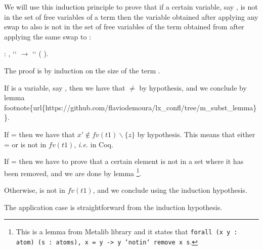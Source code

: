 We will use this induction principle to prove that if a certain variable, say , is not in the set of free variables of a term  then the variable obtained after applying any swap to  also is not in the set of free variables of the term obtained from  after applying the same swap to : 
\begin{coqdoccode}
\coqdocemptyline
\coqdocnoindent
{}  : \coqdockw{\ensuremath{\forall}}    ,  ``   \ensuremath{\rightarrow}      ``  (   ).\coqdoceol
\end{coqdoccode}
 The proof is by induction on the size of the term .
\begin{coqdoccode}
\end{coqdoccode}
If  is a variable, say , then we have that  \ensuremath{\not=}  by hypothesis, and we conclude by lemma  footnote\{url\{https://github.com/flaviodemoura/lx\_confl/tree/m\_subst\_lemma\}\}.
\begin{coqdoccode}
\end{coqdoccode}
If  =    then we have that $x' \notin fv(t1) \backslash \{z\}$ by hypothesis. This means that either  =  or  is not in $fv(t1)$, {\it i.e.}   in Coq.
\begin{coqdoccode}
\end{coqdoccode}
If  =  then we have to prove that a certain element is not in a set where it has been removed, and we are done by lemma \footnote{This is a lemma from Metalib library and it states that {\tt forall (x y : atom) (s : atoms), x = y -> y `notin` remove x s}.}. 
\begin{coqdoccode}
\end{coqdoccode}
Otherwise,  is not in $fv(t1)$, and we conclude using the induction hypothesis.
\begin{coqdoccode}
\end{coqdoccode}
The application case is straightforward from the induction hypothesis.

